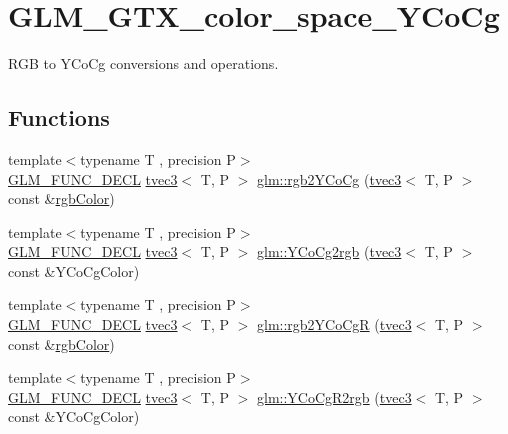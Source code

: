 \hypertarget{group__gtx__color__space___y_co_cg}{}\section{G\+L\+M\+\_\+\+G\+T\+X\+\_\+color\+\_\+space\+\_\+\+Y\+Co\+Cg}
\label{group__gtx__color__space___y_co_cg}


R\+GB to Y\+Co\+Cg conversions and operations.  


\subsection*{Functions}
\begin{DoxyCompactItemize}
\item 
{\footnotesize template$<$typename T , precision P$>$ }\\\mbox{\hyperlink{setup_8hpp_ab2d052de21a70539923e9bcbf6e83a51}{G\+L\+M\+\_\+\+F\+U\+N\+C\+\_\+\+D\+E\+CL}} \mbox{\hyperlink{structglm_1_1tvec3}{tvec3}}$<$ T, P $>$ \mbox{\hyperlink{group__gtx__color__space___y_co_cg_ga19481f6947c5b5482debd41e71b8c941}{glm\+::rgb2\+Y\+Co\+Cg}} (\mbox{\hyperlink{structglm_1_1tvec3}{tvec3}}$<$ T, P $>$ const \&\mbox{\hyperlink{group__gtx__color__space_ga36b0619e31daf57bc4a54dac2dcf34b7}{rgb\+Color}})
\item 
{\footnotesize template$<$typename T , precision P$>$ }\\\mbox{\hyperlink{setup_8hpp_ab2d052de21a70539923e9bcbf6e83a51}{G\+L\+M\+\_\+\+F\+U\+N\+C\+\_\+\+D\+E\+CL}} \mbox{\hyperlink{structglm_1_1tvec3}{tvec3}}$<$ T, P $>$ \mbox{\hyperlink{group__gtx__color__space___y_co_cg_ga6d7e988a79b299ca1fa59f537e13800b}{glm\+::\+Y\+Co\+Cg2rgb}} (\mbox{\hyperlink{structglm_1_1tvec3}{tvec3}}$<$ T, P $>$ const \&Y\+Co\+Cg\+Color)
\item 
{\footnotesize template$<$typename T , precision P$>$ }\\\mbox{\hyperlink{setup_8hpp_ab2d052de21a70539923e9bcbf6e83a51}{G\+L\+M\+\_\+\+F\+U\+N\+C\+\_\+\+D\+E\+CL}} \mbox{\hyperlink{structglm_1_1tvec3}{tvec3}}$<$ T, P $>$ \mbox{\hyperlink{group__gtx__color__space___y_co_cg_ga2e534594cc8ad252d23b14fb363ae9e2}{glm\+::rgb2\+Y\+Co\+CgR}} (\mbox{\hyperlink{structglm_1_1tvec3}{tvec3}}$<$ T, P $>$ const \&\mbox{\hyperlink{group__gtx__color__space_ga36b0619e31daf57bc4a54dac2dcf34b7}{rgb\+Color}})
\item 
{\footnotesize template$<$typename T , precision P$>$ }\\\mbox{\hyperlink{setup_8hpp_ab2d052de21a70539923e9bcbf6e83a51}{G\+L\+M\+\_\+\+F\+U\+N\+C\+\_\+\+D\+E\+CL}} \mbox{\hyperlink{structglm_1_1tvec3}{tvec3}}$<$ T, P $>$ \mbox{\hyperlink{group__gtx__color__space___y_co_cg_ga4bac5462c00df0ae89242ecdbbe5dbad}{glm\+::\+Y\+Co\+Cg\+R2rgb}} (\mbox{\hyperlink{structglm_1_1tvec3}{tvec3}}$<$ T, P $>$ const \&Y\+Co\+Cg\+Color)
\end{DoxyCompactItemize}


